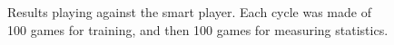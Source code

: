 \begin{figure}[!htb]
\centering
{}


\caption{Results playing against the smart player. Each cycle was made of 100 games for training, and then 100 games for measuring statistics.
\label{fig:ttt-results-smart}
}
\end{figure}

